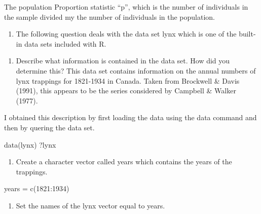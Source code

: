 \documentclass[]{article}
\newenvironment{Shaded}{\begin{snugshade}}{\end{snugshade}}
\newcommand{\DecValTok}[1]{\textcolor[rgb]{0.00,0.00,0.81}{#1}}
\newcommand{\FunctionTok}[1]{\textcolor[rgb]{0.00,0.00,0.00}{#1}}
\newcommand{\NormalTok}[1]{#1}
\newcommand{\OtherTok}[1]{\textcolor[rgb]{0.56,0.35,0.01}{#1}}
\newcommand{\SpecialCharTok}[1]{\textcolor[rgb]{0.00,0.00,0.00}{#1}}
\providecommand{\tightlist}{%
  \setlength{\itemsep}{0pt}\setlength{\parskip}{0pt}}
\begin{document}
The population Proportion statistic ``p'', which is the number of
individuals in the sample divided my the number of individuals in the
population.

\begin{enumerate}
\def\labelenumi{\arabic{enumi}.}
\setcounter{enumi}{1}
\tightlist
\item
  The following question deals with the data set lynx which is one of
  the built-in data sets included with R.
\end{enumerate}

\begin{enumerate}
\def\labelenumi{(\alph{enumi})}
\tightlist
\item
  Describe what information is contained in the data set. How did you
  determine this? This data set contains information on the annual
  numbers of lynx trappings for 1821-1934 in Canada. Taken from
  Brockwell \& Davis (1991), this appears to be the series considered by
  Campbell \& Walker (1977).
\end{enumerate}

I obtained this description by first loading the data using the data
command and then by quering the data set.

\begin{Shaded}
\begin{Highlighting}[]
\FunctionTok{data}\NormalTok{(lynx)}
\NormalTok{?lynx}
\end{Highlighting}
\end{Shaded}

\begin{enumerate}
\def\labelenumi{(\alph{enumi})}
\setcounter{enumi}{1}
\tightlist
\item
  Create a character vector called years which contains the years of the
  trappings.
\end{enumerate}

\begin{Shaded}
\begin{Highlighting}[]
\NormalTok{years }\OtherTok{=} \FunctionTok{c}\NormalTok{(}\DecValTok{1821}\SpecialCharTok{:}\DecValTok{1934}\NormalTok{)}
\end{Highlighting}
\end{Shaded}

\begin{enumerate}
\def\labelenumi{(\alph{enumi})}
\setcounter{enumi}{2}
\tightlist
\item
  Set the names of the lynx vector equal to years.
\end{enumerate}
\end{document}
